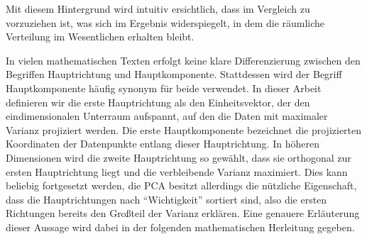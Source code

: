 Mit diesem Hintergrund wird intuitiv ersichtlich, dass  im Vergleich zu  vorzuziehen ist, was sich im Ergebnis widerspiegelt, in dem die räumliche Verteilung im Wesentlichen erhalten bleibt.

In vielen mathematischen Texten erfolgt keine klare Differenzierung zwischen den Begriffen Hauptrichtung und Hauptkomponente.
Stattdessen wird der Begriff Hauptkomponente häufig synonym für beide verwendet.
In dieser Arbeit definieren wir die erste Hauptrichtung als den Einheitsvektor, der den eindimensionalen Unterraum aufspannt, auf den die Daten mit maximaler Varianz projiziert werden.
Die erste Hauptkomponente bezeichnet die projizierten Koordinaten der Datenpunkte entlang dieser Hauptrichtung.
In höheren Dimensionen wird die zweite Hauptrichtung so gewählt, dass sie orthogonal zur ersten Hauptrichtung liegt und die verbleibende Varianz maximiert.
Dies kann beliebig fortgesetzt werden, die PCA besitzt allerdings die nützliche Eigenschaft, dass die Hauptrichtungen nach \enquote{Wichtigkeit} sortiert sind, also die ersten Richtungen bereits den Großteil der Varianz erklären.
Eine genauere Erläuterung dieser Aussage wird dabei in der folgenden mathematischen Herleitung gegeben.

